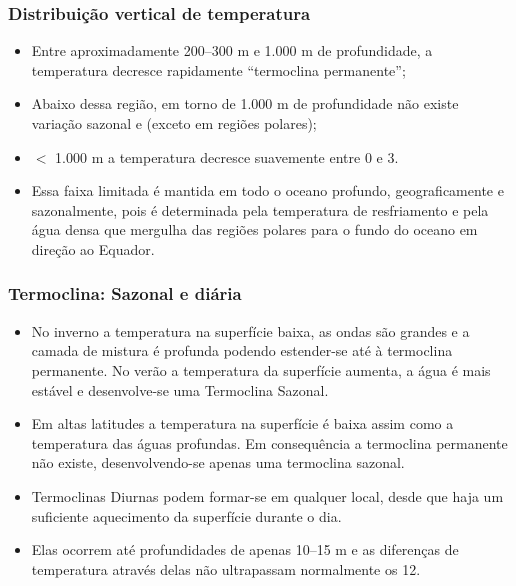 \begin{frame}
  \frametitle{Distribuição vertical de temperatura}
  \small{
  \begin{itemize}[<+-| alert@+>]
    \item Entre aproximadamente 200--300 m e 1.000 m de profundidade, a
          temperatura decresce rapidamente ``termoclina permanente'';
    \item Abaixo dessa região, em torno de 1.000 m de profundidade não existe
          variação sazonal e (exceto em regiões polares);
    \item $<$ 1.000 m a temperatura decresce suavemente entre 0\textcelsius{} e
          3\textcelsius{}.
    \item Essa faixa limitada é mantida em todo o oceano profundo,
          geograficamente e sazonalmente, pois é determinada pela temperatura
          de resfriamento e pela água densa que mergulha das regiões polares
          para o fundo do oceano em direção ao Equador.
  \end{itemize}
  }
\end{frame}


\begin{frame}
  \frametitle{Termoclina: Sazonal e diária}
  \scriptsize{
  \begin{itemize}[<+-| alert@+>]
    \item No inverno a temperatura na superfície baixa, as ondas são grandes
          e a camada de mistura é profunda podendo estender-se até à
          termoclina permanente.  No verão a temperatura da superfície aumenta,
          a água é mais estável e desenvolve-se uma Termoclina Sazonal.
    \item Em altas latitudes a temperatura na superfície é baixa assim como a
          temperatura das águas profundas.  Em consequência a termoclina
          permanente não existe, desenvolvendo-se apenas uma termoclina
          sazonal.
    \item Termoclinas Diurnas podem formar-se em qualquer local, desde que
          haja um suficiente aquecimento da superfície durante o dia.
    \item Elas ocorrem até profundidades de apenas 10--15 m e as diferenças de
          temperatura através delas não ultrapassam normalmente os 12\textcelsius{}.
  \end{itemize}
  }
\end{frame}


